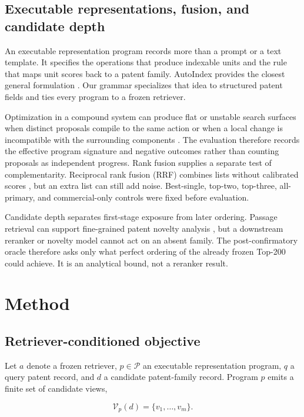 \documentclass[final,5p,times,twocolumn]{elsarticle}
\begin{document}
\subsection{Executable representations, fusion, and candidate depth}

An executable representation program records more than a prompt or a text
template. It specifies the operations that produce indexable units and the
rule that maps unit scores back to a patent family. AutoIndex provides the
closest general formulation \cite{autoindex2026}. Our grammar specializes
that idea to structured patent fields and ties every program to a frozen
retriever.

Optimization in a compound system can produce flat or unstable search
surfaces when distinct proposals compile to the same action or when a local
change is incompatible with the surrounding components
\cite{promptcoinflip2026}. The evaluation therefore records the effective
program signature and negative outcomes rather than counting proposals as
independent progress.
Rank fusion supplies a separate test of complementarity. Reciprocal rank
fusion (RRF) combines lists without calibrated scores \cite{rrf2009}, but an
extra list can still add noise. Best-single, top-two, top-three, all-primary,
and commercial-only controls were fixed before evaluation.

Candidate depth separates first-stage exposure from later ordering. Passage
retrieval can support fine-grained patent novelty analysis
\cite{finepatents2026}, but a downstream reranker or novelty model cannot act
on an absent family. The post-confirmatory oracle therefore asks only what
perfect ordering of the already frozen Top-200 could achieve. It is an
analytical bound, not a reranker result.

\section{Method}

\subsection{Retriever-conditioned objective}

Let \(a\) denote a frozen retriever, \(p\in\mathcal{P}\) an executable
representation program, \(q\) a query patent record, and \(d\) a candidate
patent-family record. Program \(p\) emits a finite set of candidate views,

\begin{equation}
 \mathcal{V}_{p}(d)=\{v_1,\ldots,v_m\}.
\end{equation}
\end{document}
